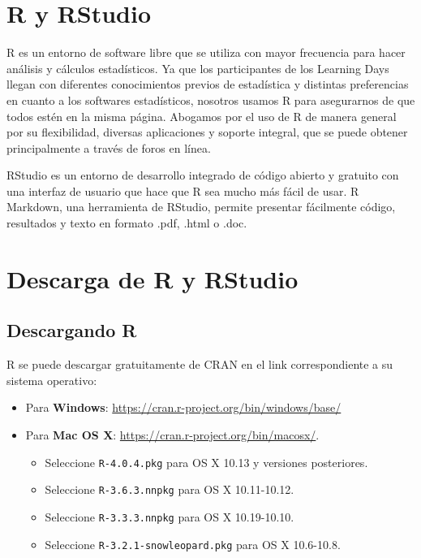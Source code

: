 \documentclass[12pt,spanish,]{book}
\providecommand{\tightlist}{%
  \setlength{\itemsep}{0pt}\setlength{\parskip}{0pt}}
\begin{document}
\hypertarget{r-y-rstudio}{%
\section{R y RStudio}\label{r-y-rstudio}}

R es un entorno de software libre que se utiliza con mayor frecuencia para hacer análisis y cálculos estadísticos. Ya que los participantes de los Learning Days llegan con diferentes conocimientos previos de estadística y distintas preferencias en cuanto a los softwares estadísticos, nosotros usamos R para asegurarnos de que todos estén en la misma página. Abogamos por el uso de R de manera general por su flexibilidad, diversas aplicaciones y soporte integral, que se puede obtener principalmente a través de foros en línea.

RStudio es un entorno de desarrollo integrado de código abierto y gratuito con una interfaz de usuario que hace que R sea mucho más fácil de usar. R Markdown, una herramienta de RStudio, permite presentar fácilmente código, resultados y texto en formato .pdf, .html o .doc.

\hypertarget{descarga-de-r-y-rstudio}{%
\section{Descarga de R y RStudio}\label{descarga-de-r-y-rstudio}}

\hypertarget{descargando-r}{%
\subsection{Descargando R}\label{descargando-r}}

R se puede descargar gratuitamente de CRAN en el link correspondiente a su sistema operativo:

\begin{itemize}
\tightlist
\item
  Para \textbf{Windows}: \url{https://cran.r-project.org/bin/windows/base/}
\item
  Para \textbf{Mac OS X}: \url{https://cran.r-project.org/bin/macosx/}.

  \begin{itemize}
  \tightlist
  \item
    Seleccione \texttt{R-4.0.4.pkg} para OS X 10.13 y versiones posteriores.
  \item
    Seleccione \texttt{R-3.6.3.nnpkg} para OS X 10.11-10.12.
  \item
    Seleccione \texttt{R-3.3.3.nnpkg} para OS X 10.19-10.10.
  \item
    Seleccione \texttt{R-3.2.1-snowleopard.pkg} para OS X 10.6-10.8.
  \end{itemize}
\end{itemize}
\end{document}
